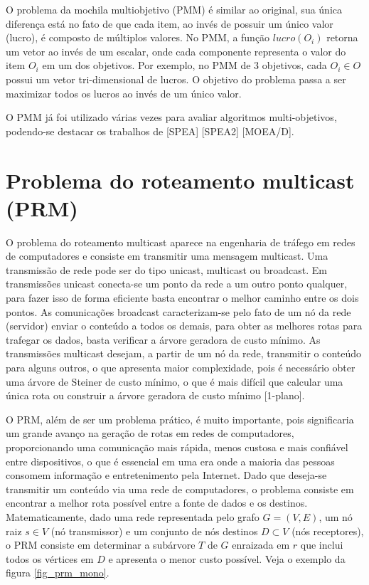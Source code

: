 O problema da mochila multiobjetivo (PMM) é similar ao original, sua única diferença está no fato de que cada item, ao invés de possuir um único valor (lucro), é composto de múltiplos valores. No PMM, a função $lucro(O_i)$ retorna um vetor ao invés de um escalar, onde cada componente representa o valor do item $O_i$ em um dos objetivos. Por exemplo, no PMM de 3 objetivos, cada $O_i \in O$ possui um vetor tri-dimensional de lucros. O objetivo do problema passa a ser maximizar todos os lucros ao invés de um único valor.

O PMM já foi utilizado várias vezes para avaliar algoritmos multi-objetivos, podendo-se destacar os trabalhos de [SPEA] [SPEA2] [MOEA/D].

\section{Problema do roteamento multicast (PRM)}

O problema do roteamento multicast aparece na engenharia de tráfego em redes de computadores e consiste em transmitir uma mensagem multicast. Uma transmissão de rede pode ser do tipo unicast, multicast ou broadcast. Em transmissões unicast conecta-se um ponto da rede a um outro ponto qualquer, para fazer isso de forma eficiente basta encontrar o melhor caminho entre os dois pontos. As comunicações broadcast caracterizam-se pelo fato de um nó da rede (servidor) enviar o conteúdo a todos os demais, para obter as melhores rotas para trafegar os dados, basta verificar a árvore geradora de custo mínimo. As transmissões multicast desejam, a partir de um nó da rede, transmitir o conteúdo para alguns outros, o que apresenta maior complexidade, pois é necessário obter uma árvore de Steiner de custo mínimo, o que é mais difícil que calcular uma única rota ou construir a árvore geradora de custo mínimo [1-plano].

O PRM, além de ser um problema prático, é muito importante, pois significaria um grande avanço na geração de rotas em redes de computadores, proporcionando uma comunicação mais rápida, menos custosa e mais confiável entre dispositivos, o que é essencial em uma era onde a maioria das pessoas consomem informação e entretenimento pela Internet. Dado que deseja-se transmitir um conteúdo via uma rede de computadores, o problema consiste em encontrar a melhor rota possível entre a fonte de dados e os destinos. Matematicamente, dado uma rede representada pelo grafo $G=(V,E)$, um nó raiz $s \in V$ (nó transmissor) e um conjunto de nós destinos $D \subset V$ (nós receptores), o PRM consiste em determinar a subárvore $T$ de $G$ enraizada em $r$ que inclui todos os vértices em $D$ e apresenta o menor custo possível. Veja o exemplo da figura \ref{fig_prm_mono}.

